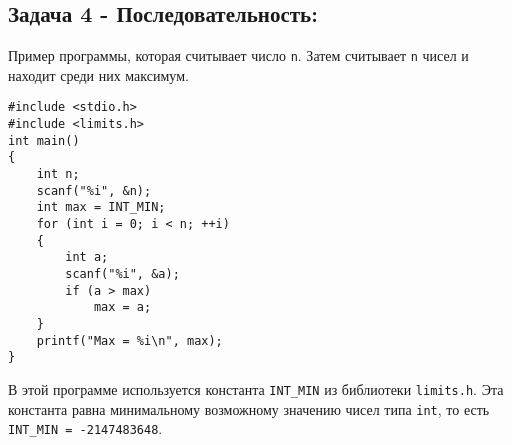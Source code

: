 \documentclass{article}
\begin{document}
\subsection*{Задача 4 - Последовательность:} 
Пример программы, которая считывает число \texttt{n}. Затем считывает \texttt{n} чисел и находит среди них максимум. 

\begin{lstlisting}
#include <stdio.h>
#include <limits.h>
int main() 
{
    int n;
    scanf("%i", &n);
    int max = INT_MIN;
    for (int i = 0; i < n; ++i) 
    {
        int a;
        scanf("%i", &a);
        if (a > max)
            max = a;
    }
    printf("Max = %i\n", max);
}
\end{lstlisting}
В этой программе используется константа \texttt{INT\_MIN} из библиотеки \texttt{limits.h}. Эта константа равна минимальному возможному значению чисел типа \texttt{int}, то есть \texttt{INT\_MIN = -2147483648}.
\end{document}
